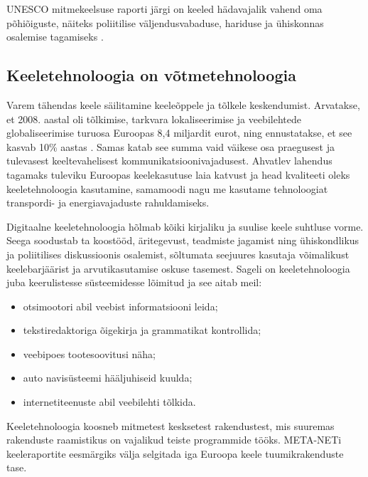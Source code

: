 \documentclass[]{../metanetpaper}
\begin{document}
\begin{multicols}{2}
UNESCO mitmekeelsuse raporti järgi on keeled hädavajalik vahend oma põhiõiguste, näiteks poliitilise väljendusvabaduse, hariduse ja ühiskonnas osalemise tagamiseks \cite{Unesco1}.


\subsection{Keeletehnoloogia on võtmetehnoloogia}

Varem tähendas keele säilitamine keeleõppele ja tõlkele keskendumist.
Arvatakse, et 2008. aastal oli tõlkimise, tarkvara lokaliseerimise ja veebilehtede globalisee\-ri\-mise turuosa Euroopas 8,4 miljardit {eurot}, ning ennustatakse, et see kasvab 10\% aastas \cite{EC3}. 
Samas katab see summa vaid väikese osa praegusest ja tulevasest keeltevahelisest kommunikatsioonivajadusest. 
Ahvatlev lahendus tagamaks tuleviku Euroopas keelekasutuse laia katvust ja head kvaliteeti oleks keeletehnoloogia kasutamine, samamoodi nagu me kasutame tehnoloogiat transpordi- ja energiavajaduste rahuldamiseks.

Digitaalne keeletehnoloogia hõlmab kõiki kirjaliku ja suulise keele suhtluse vorme. 
Seega soodustab ta koostööd, äritegevust, teadmiste jagamist ning ühiskondlikus ja poliitilises diskussioonis osalemist, sõltumata seejuures kasutaja võimalikust keelebarjäärist ja arvutikasutamise oskuse tasemest.
Sageli on keeletehno\-loogia juba keerulistesse süsteemi\-desse lõimitud ja see aitab meil:
\begin{itemize}
      \item otsimootori abil veebist informatsiooni leida;
      \item tekstiredaktoriga õigekirja ja grammatikat kontrollida;
      \item veebipoes tootesoovitusi näha;
      \item auto navisüsteemi hääljuhiseid kuulda;
      \item internetiteenuste abil veebilehti tõl\-kida.
    \end{itemize}

Keeletehnoloogia koosneb mitmetest kesk\-setest raken\-dustest, mis suuremas raken\-duste raamistikus on vajalikud teiste prog\-rammide tööks. 
META-NETi keele\-raportite eesmärgiks välja selgitada iga Euroopa keele tuumikrakenduste tase.




\end{multicols}
\end{document}
